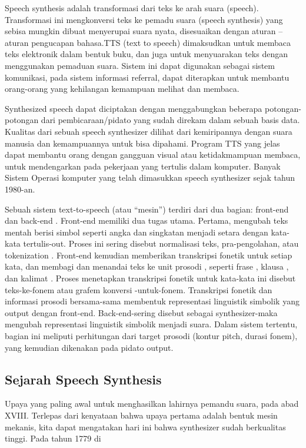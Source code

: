 Speech synthesis adalah transformasi dari teks ke arah suara (speech). Transformasi ini mengkonversi teks ke pemadu suara (speech synthesis) yang sebisa mungkin dibuat menyerupai suara nyata, disesuaikan dengan aturan – aturan pengucapan bahasa.TTS (text to speech) dimaksudkan untuk membaca teks elektronik dalam bentuk buku, dan juga untuk menyuarakan teks dengan menggunakan pemaduan suara. Sistem ini dapat digunakan sebagai sistem komunikasi, pada sistem informasi referral, dapat diterapkan untuk membantu orang-orang yang kehilangan kemampuan melihat dan membaca.

Synthesized speech dapat diciptakan dengan menggabungkan beberapa potongan-potongan dari pembicaraan/pidato yang sudah direkam dalam sebuah basis data. Kualitas dari sebuah speech synthesizer dilihat dari kemiripannya dengan suara manusia dan kemampuannya untuk bisa dipahami. Program TTS yang jelas dapat membantu orang dengan gangguan visual atau ketidakmampuan membaca, untuk mendengarkan pada pekerjaan yang tertulis dalam komputer. Banyak Sistem Operasi komputer yang telah dimasukkan speech synthesizer sejak tahun 1980-an.

Sebuah sistem text-to-speech (atau “mesin”) terdiri dari dua bagian: front-end dan back-end . Front-end memiliki dua tugas utama. Pertama, mengubah teks mentah berisi simbol seperti angka dan singkatan menjadi setara dengan kata-kata tertulis-out. Proses ini sering disebut normalisasi teks, pra-pengolahan, atau tokenization . Front-end kemudian memberikan transkripsi fonetik untuk setiap kata, dan membagi dan menandai teks ke unit prosodi , seperti frase , klausa , dan kalimat . Proses menetapkan transkripsi fonetik untuk kata-kata ini disebut teks-ke-fonem atau grafem konversi -untuk-fonem. Transkripsi fonetik dan informasi prosodi bersama-sama membentuk representasi linguistik simbolik yang output dengan front-end. Back-end-sering disebut sebagai synthesizer-maka mengubah representasi linguistik simbolik menjadi suara. Dalam sistem tertentu, bagian ini meliputi perhitungan dari target prosodi (kontur pitch, durasi fonem), yang kemudian dikenakan pada pidato output.

\subsection{Sejarah Speech Synthesis}
Upaya yang paling awal untuk menghasilkan lahirnya pemandu suara, pada abad XVIII. Terlepas dari kenyataan bahwa upaya pertama  adalah bentuk mesin mekanis, kita dapat mengatakan hari ini  bahwa synthesizer sudah berkualitas tinggi. Pada tahun 1779 di

